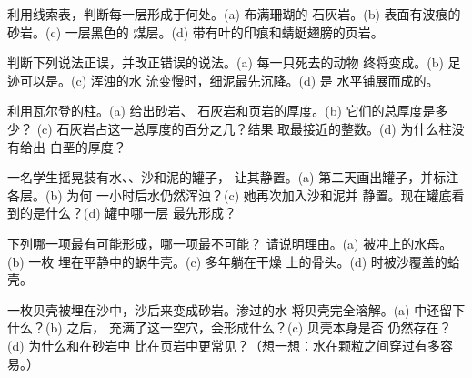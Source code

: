 \begin{exercise}[$\star$]\label{exo:g7:sediments-and-fossils:3}
利用线索表，判断每一层形成于何处。(a) 布满珊瑚的
石灰岩。(b) 表面有波痕的砂岩。(c) 一层黑色的
煤层。(d) 带有叶的印痕和蜻蜓翅膀的页岩。
\end{exercise}

\begin{exercise}[$\star$]\label{exo:g7:sediments-and-fossils:4}
判断下列说法正误，并改正错误的说法。(a) 每一只死去的动物
终将变成。(b) 足迹可以是。(c) 浑浊的水
流变慢时，细泥最先沉降。(d) 是
水平铺展而成的。
\end{exercise}

\begin{exercise}[$\star\star$]\label{exo:g7:sediments-and-fossils:5}
利用瓦尔登的柱。(a) 给出砂岩、
石灰岩和页岩的厚度。(b) 它们的总厚度是多少？
(c) 石灰岩占这一总厚度的百分之几？结果
取最接近的整数。(d) 为什么柱没有给出
白垩的厚度？
\end{exercise}

\begin{exercise}[$\star\star$]\label{exo:g7:sediments-and-fossils:6}
一名学生摇晃装有水、、沙和泥的罐子，
让其静置。(a) 第二天画出罐子，并标注各层。(b) 为何
一小时后水仍然浑浊？(c) 她再次加入沙和泥并
静置。现在罐底看到的是什么？(d) 罐中哪一层
最先形成？
\end{exercise}

\begin{exercise}[$\star\star$]\label{exo:g7:sediments-and-fossils:7}
下列哪一项最有可能形成，哪一项最不可能？
请说明理由。(a) 被冲上的水母。(b) 一枚
埋在平静中的蜗牛壳。(c) 多年躺在干燥
上的骨头。(d) 时被沙覆盖的蛤壳。
\end{exercise}

\begin{exercise}[$\star\star$]\label{exo:g7:sediments-and-fossils:8}
一枚贝壳被埋在沙中，沙后来变成砂岩。渗过的水
将贝壳完全溶解。(a) 中还留下什么？(b) 之后，
充满了这一空穴，会形成什么？(c) 贝壳本身是否
仍然存在？(d) 为什么和在砂岩中
比在页岩中更常见？（想一想：水在颗粒之间穿过有多容易。）
\end{exercise}

